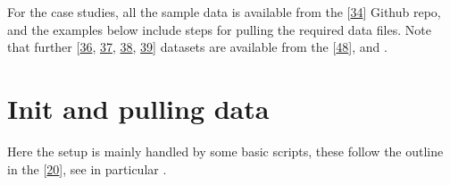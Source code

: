 \documentclass[letterpaper,table,10pt,english]{jupyterBook}
\begin{document}
\sphinxAtStartPar
For the case studies, all the sample data is available from the  {[}\hyperlink{cite.backmatter/bibliography:id606}{34}{]} Github repo, and the examples below include steps for pulling the required data files. Note that further  {[}\hyperlink{cite.backmatter/bibliography:id762}{36}, \hyperlink{cite.backmatter/bibliography:id626}{37}, \hyperlink{cite.backmatter/bibliography:id803}{38}, \hyperlink{cite.backmatter/bibliography:id765}{39}{]} datasets are available from the  {[}\hyperlink{cite.backmatter/bibliography:id677}{48}{]}, and .


\section{Init and pulling data}
\label{\detokenize{part2/basic_fitting_numerics_intro_260723:init-and-pulling-data}}
\sphinxAtStartPar
Here the setup is mainly handled by some basic scripts, these follow the outline in the  {[}\hyperlink{cite.backmatter/bibliography:id679}{20}{]}, see in particular .
\end{document}
